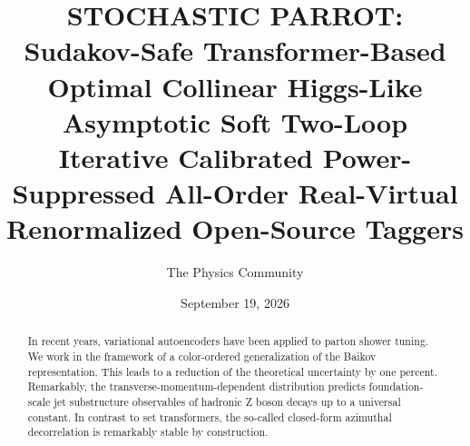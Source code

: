 \documentclass[11pt]{article}
\title{STOCHASTIC PARROT: Sudakov-Safe Transformer-Based Optimal Collinear Higgs-Like Asymptotic Soft Two-Loop Iterative Calibrated Power-Suppressed All-Order Real-Virtual Renormalized Open-Source Taggers}
\author{The Physics Community}
\date{September 19, 2026}
\begin{document}
\maketitle
\begin{abstract}
In recent years, variational autoencoders have been applied to parton
shower tuning. We work in the framework of a color-ordered
generalization of the Baikov representation. This leads to a reduction
of the theoretical uncertainty by one percent. Remarkably, the
transverse-momentum-dependent distribution predicts foundation-scale jet
substructure observables of hadronic Z boson decays up to a universal
constant. In contrast to set transformers, the so-called closed-form
azimuthal decorrelation is remarkably stable by construction.
\end{abstract}
\tableofcontents




\nocite{*}


\end{document}
